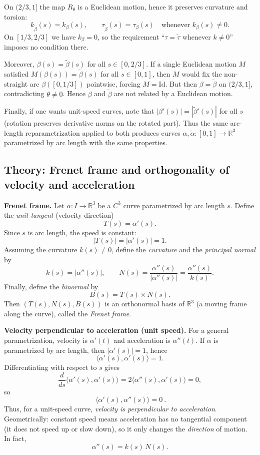 \documentclass[12pt,a4paper]{article}
\theoremstyle{plain}
\theoremstyle{definition}      %
\begin{document}
On $(2/3,1]$ the map $R_\theta$ is a Euclidean motion, hence it preserves curvature and torsion:
\[
k_{\widetilde\beta}(s)=k_\beta(s),\qquad \tau_{\widetilde\beta}(s)=\tau_\beta(s)
\quad \text{whenever }k_\beta(s)\neq 0.
\]
On $[1/3,2/3]$ we have $k_\beta=0$, so the requirement ``$\tau=\widetilde\tau$ whenever $k\neq 0$''
imposes no condition there.

Moreover, $\beta(s)=\widetilde\beta(s)$ for all $s\in[0,2/3]$.
If a single Euclidean motion $M$ satisfied $M(\beta(s))=\widetilde\beta(s)$ for all $s\in[0,1]$,
then $M$ would fix the non-straight arc $\beta([0,1/3])$ pointwise, forcing $M=\mathrm{Id}$.
But then $\beta=\widetilde\beta$ on $(2/3,1]$, contradicting $\theta\neq 0$.
Hence $\beta$ and $\widetilde\beta$ are not related by a Euclidean motion.

Finally, if one wants unit-speed curves, note that $|\beta'(s)|=|\widetilde\beta'(s)|$ for all $s$
(rotation preserves derivative norms on the rotated part).
Thus the same arc-length reparametrization applied to both produces curves
$\alpha,\widetilde\alpha:[0,1]\to\mathbb{R}^3$ parametrized by arc length with the same properties.


\subsection*{Theory: Frenet frame and orthogonality of velocity and acceleration}

\noindent\textbf{Frenet frame.}
Let $\alpha:I\to\mathbb{R}^3$ be a $C^3$ curve parametrized by arc length $s$.
Define the \emph{unit tangent} (velocity direction)
\[
T(s)=\alpha'(s).
\]
Since $s$ is arc length, the speed is constant:
\[
|T(s)|=|\alpha'(s)|=1.
\]
Assuming the curvature $k(s)\neq 0$, define the \emph{curvature} and the \emph{principal normal} by
\[
k(s)=|\alpha''(s)|,\qquad N(s)=\frac{\alpha''(s)}{|\alpha''(s)|}=\frac{\alpha''(s)}{k(s)}.
\]
Finally, define the \emph{binormal} by
\[
B(s)=T(s)\times N(s).
\]
Then $(T(s),N(s),B(s))$ is an orthonormal basis of $\mathbb{R}^3$ (a moving frame along the curve),
called the \emph{Frenet frame}.

\medskip
\noindent\textbf{Velocity perpendicular to acceleration (unit speed).}
For a general parametrization, velocity is $\alpha'(t)$ and acceleration is $\alpha''(t)$.
If $\alpha$ is parametrized by arc length, then $|\alpha'(s)|=1$, hence
\[
\langle \alpha'(s),\alpha'(s)\rangle = 1.
\]
Differentiating with respect to $s$ gives
\[
\frac{d}{ds}\langle \alpha'(s),\alpha'(s)\rangle
=2\langle \alpha''(s),\alpha'(s)\rangle=0,
\]
so
\[
\boxed{\ \langle \alpha'(s),\alpha''(s)\rangle=0\ }.
\]
Thus, for a unit-speed curve, \emph{velocity is perpendicular to acceleration}.
Geometrically: constant speed means acceleration has no tangential component (it does not speed up or slow down),
so it only changes the \emph{direction} of motion. In fact,
\[
\alpha''(s)=k(s)\,N(s).
\]
\end{document}
